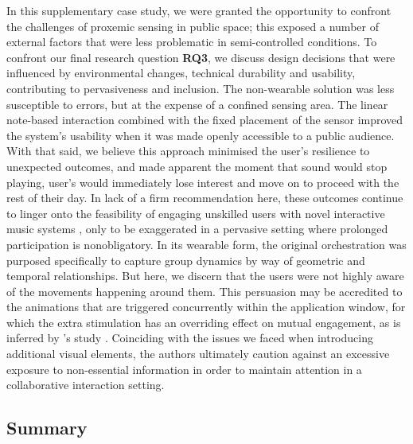 In this supplementary case study, we were granted the opportunity to confront the challenges of proxemic sensing in public space; this exposed a number of external factors that were less problematic in semi-controlled conditions. To confront our final research question \textbf{RQ3}, we discuss design decisions that were influenced by environmental changes, technical durability and usability, contributing to pervasiveness and inclusion. The non-wearable solution was less susceptible to errors, but at the expense of a confined sensing area. The linear note-based interaction combined with the fixed placement of the sensor improved the system's usability when it was made openly accessible to a public audience. With that said, we believe this approach minimised the user's resilience to unexpected outcomes, and made apparent the moment that sound would stop playing, user's would immediately lose interest and move on to proceed with the rest of their day. In lack of a firm recommendation here, these outcomes continue to linger onto the feasibility of engaging unskilled users with novel interactive music systems \citep{holland_musical_2019}, only to be exaggerated in a pervasive setting where prolonged participation is nonobligatory. In its wearable form, the original orchestration was purposed specifically to capture group dynamics by way of geometric and temporal relationships. But here, we discern that the users were not highly aware of the movements happening around them. This persuasion may be accredited to the animations that are triggered concurrently within the application window, for which the extra stimulation has an overriding effect on mutual engagement, as is inferred by \citeauthor{bryan-kinns_mutual_2013}'s study \cite{bryan-kinns_mutual_2013}. Coinciding with the issues we faced when introducing additional visual elements, the authors ultimately caution against an excessive exposure to non-essential information in order to maintain attention in a collaborative interaction setting.


\subsection{Summary}

